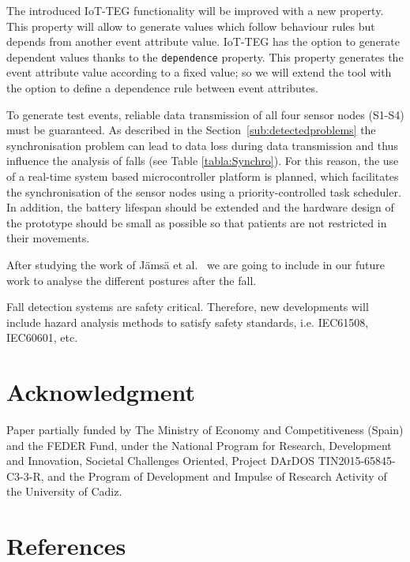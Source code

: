 \documentclass[review]{elsarticle}
\begin{document}
The introduced IoT-TEG functionality will be improved with a new property. This property will allow to generate values 
which follow behaviour rules but depends from another event attribute value. IoT-TEG has the option
to generate dependent values thanks to the \texttt{dependence} property. This property generates the event attribute value 
according to a fixed value; so we will extend the tool with the option to define a dependence rule between event attributes. 

To generate test events, reliable data transmission of all four sensor nodes (S1-S4) must be guaranteed. As described in 
the Section~\ref{sub:detectedproblems} the synchronisation problem can lead to data loss during data transmission and 
thus influence the analysis of falls (see Table \ref{tabla:Synchro}). For this reason, the use of a real-time system 
based microcontroller platform is planned, which facilitates the synchronisation of the sensor nodes using a 
priority-controlled task scheduler. In addition, the battery lifespan should be extended and the hardware design of the 
prototype should be small as possible so that patients are not
restricted in their movements.

After studying the work of J{\"a}ms{\"a} et al.~\cite{jamsa2014fall} we are going to include in our future work to
analyse the different postures after the fall. 

Fall detection systems are safety critical. Therefore, new developments will include hazard analysis methods
to satisfy safety standards, i.e. IEC61508, IEC60601, etc.

\section*{Acknowledgment}

Paper partially funded by The Ministry of Economy and Competitiveness (Spain) and the FEDER Fund, under the National Program for 
Research, Development and Innovation, Societal Challenges Oriented, Project DArDOS TIN2015-65845-C3-3-R, and the Program of
Development and Impulse of Research Activity of the University of Cadiz.

\section*{References}


\end{document}
